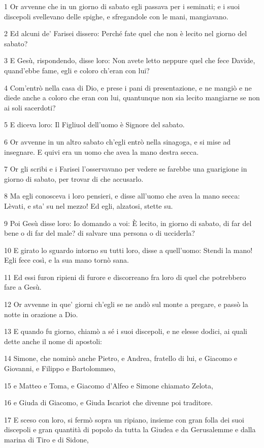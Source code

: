\par 1 Or avvenne che in un giorno di sabato egli passava per i seminati; e i suoi discepoli svellevano delle spighe, e sfregandole con le mani, mangiavano.
\par 2 Ed alcuni de' Farisei dissero: Perché fate quel che non è lecito nel giorno del sabato?
\par 3 E Gesù, rispondendo, disse loro: Non avete letto neppure quel che fece Davide, quand'ebbe fame, egli e coloro ch'eran con lui?
\par 4 Com'entrò nella casa di Dio, e prese i pani di presentazione, e ne mangiò e ne diede anche a coloro che eran con lui, quantunque non sia lecito mangiarne se non ai soli sacerdoti?
\par 5 E diceva loro: Il Figliuol dell'uomo è Signore del sabato.
\par 6 Or avvenne in un altro sabato ch'egli entrò nella sinagoga, e si mise ad insegnare. E quivi era un uomo che avea la mano destra secca.
\par 7 Or gli scribi e i Farisei l'osservavano per vedere se farebbe una guarigione in giorno di sabato, per trovar di che accusarlo.
\par 8 Ma egli conosceva i loro pensieri, e disse all'uomo che avea la mano secca: Lèvati, e sta' su nel mezzo! Ed egli, alzatosi, stette su.
\par 9 Poi Gesù disse loro: Io domando a voi: È lecito, in giorno di sabato, di far del bene o di far del male? di salvare una persona o di ucciderla?
\par 10 E girato lo sguardo intorno su tutti loro, disse a quell'uomo: Stendi la mano! Egli fece così, e la sua mano tornò sana.
\par 11 Ed essi furon ripieni di furore e discorreano fra loro di quel che potrebbero fare a Gesù.
\par 12 Or avvenne in que' giorni ch'egli se ne andò sul monte a pregare, e passò la notte in orazione a Dio.
\par 13 E quando fu giorno, chiamò a sé i suoi discepoli, e ne elesse dodici, ai quali dette anche il nome di apostoli:
\par 14 Simone, che nominò anche Pietro, e Andrea, fratello di lui, e Giacomo e Giovanni, e Filippo e Bartolommeo,
\par 15 e Matteo e Toma, e Giacomo d'Alfeo e Simone chiamato Zelota,
\par 16 e Giuda di Giacomo, e Giuda Iscariot che divenne poi traditore.
\par 17 E sceso con loro, si fermò sopra un ripiano, insieme con gran folla dei suoi discepoli e gran quantità di popolo da tutta la Giudea e da Gerusalemme e dalla marina di Tiro e di Sidone,
